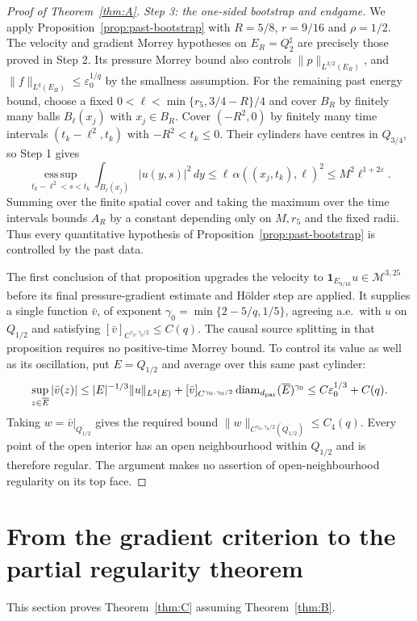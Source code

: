 \documentclass[11pt,reqno]{amsart}
\begin{document}
\begin{proof}[Proof of Theorem~\ref{thm:A}]
\emph{Step 3: the one-sided bootstrap and endgame.}
We apply Proposition~\ref{prop:past-bootstrap} with
$R=5/8$, $r=9/16$ and $\rho=1/2$.
The velocity and gradient Morrey hypotheses on $E_R=Q_2^\sharp$
are precisely those proved in Step 2. Its pressure Morrey bound also
controls $\|p\|_{L^{3/2}(E_R)}$, and
$\|f\|_{L^q(E_R)}\le\varepsilon_0^{1/q}$ by the smallness assumption.
For the remaining past energy bound, choose a fixed
$0<\ell<\min\{r_5,3/4-R\}/4$ and cover $B_R$ by finitely many
balls $B_\ell(x_j)$ with $x_j\in B_R$. Cover $(-R^2,0)$ by finitely
many time intervals $(t_k-\ell^2,t_k)$ with $-R^2<t_k\le0$.
Their cylinders have centres in $Q_{3/4}$, so Step 1 gives
\[
 \operatorname*{ess\,sup}_{t_k-\ell^2<s<t_k}
    \int_{B_\ell(x_j)}|u(y,s)|^2\,dy
   \le \ell\,\alpha((x_j,t_k),\ell)^2
   \le M^2\ell^{1+2\varepsilon}.
\]
Summing over the finite spatial cover and taking the maximum over the
time intervals bounds $A_R$ by a constant depending only on $M,r_5$
and the fixed radii. Thus every quantitative hypothesis of
Proposition~\ref{prop:past-bootstrap} is controlled by the past data.

The first conclusion of that proposition upgrades the velocity to
$\mathbf1_{E_{9/16}}u\in\mathcal M^{3,25}$ before its final
pressure-gradient estimate and H\"older step are applied.
It supplies a single function $\bar v$, of exponent
$\gamma_0=\min\{2-5/q,1/5\}$, agreeing a.e.\ with $u$ on $Q_{1/2}$
and satisfying $[\bar v]_{C^{\gamma_0,\gamma_0/2}}\le C(q)$.
The causal source splitting in that proposition requires no positive-time
Morrey bound. To control its value as well as its oscillation, put
$E=Q_{1/2}$ and average over this same past cylinder:
\[
 \sup_{z\in\overline E}|\bar v(z)|
 \le |E|^{-1/3}\|u\|_{L^3(E)}
       +[\bar v]_{C^{\gamma_0,\gamma_0/2}}
           \operatorname{diam}_{d_{\mathrm{par}}}(\overline E)^{\gamma_0}
 \le C\varepsilon_0^{1/3}+C(q).
\]
Taking $w=\bar v|_{\overline{Q_{1/2}}}$ gives the required bound
$\|w\|_{C^{\gamma_0,\gamma_0/2}(\overline{Q_{1/2}})}\le C_4(q)$.
Every point of the open interior has an open neighbourhood within
$Q_{1/2}$ and is therefore regular. The argument makes no assertion of
open-neighbourhood regularity on its top face.
\end{proof}
\section{From the gradient criterion to the partial regularity theorem}
\label{sec:covering}

This section proves Theorem~\ref{thm:C} assuming Theorem~\ref{thm:B}.
\end{document}
